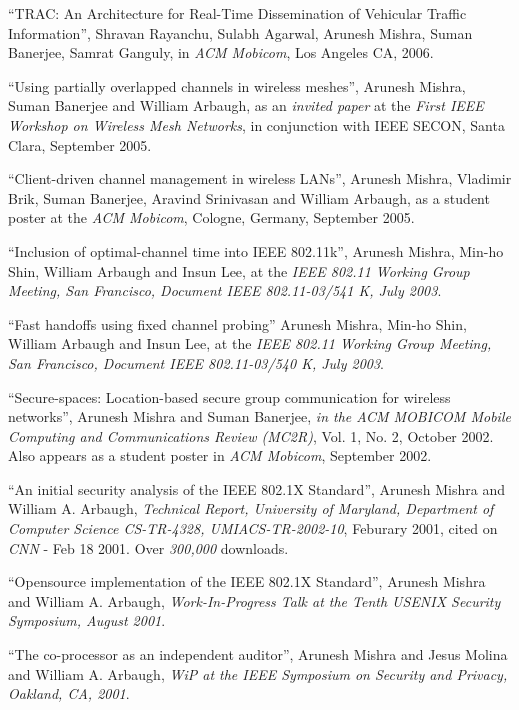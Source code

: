 \begin{resume}
\mybullet ``TRAC: An Architecture for Real-Time Dissemination of Vehicular Traffic Information'',
Shravan Rayanchu, Sulabh Agarwal, Arunesh Mishra, Suman Banerjee, Samrat Ganguly,  in {\it ACM Mobicom}, Los Angeles CA, 2006.

\mybullet ``Using partially overlapped channels in wireless meshes'', Arunesh Mishra, Suman Banerjee and William Arbaugh,
as an {\em invited paper} at the {\em First IEEE Workshop on Wireless Mesh Networks}, in conjunction with IEEE SECON,
Santa Clara, September 2005.

\mybullet ``Client-driven channel management in wireless LANs'', Arunesh Mishra, Vladimir Brik, Suman Banerjee, Aravind Srinivasan
and William Arbaugh, as a student poster at  the {\em ACM Mobicom}, Cologne, Germany, September 2005.

\mybullet ``Inclusion of optimal-channel time into IEEE 802.11k'', Arunesh Mishra,  Min-ho Shin, William Arbaugh and Insun Lee,
at the {\em IEEE 802.11 Working Group Meeting, San Francisco, Document IEEE 802.11-03/541 K, July 2003}.

\mybullet ``Fast handoffs using fixed channel probing'' Arunesh Mishra, Min-ho Shin, William Arbaugh and Insun Lee, at the 
{\em IEEE 802.11 Working Group Meeting, San Francisco, Document IEEE 802.11-03/540 K, July 2003}.

\mybullet ``Secure-spaces: Location-based secure group communication for wireless networks'', Arunesh Mishra and 
Suman Banerjee, {\em in the ACM MOBICOM Mobile Computing and Communications Review (MC2R)}, Vol. 1, No. 2, October 2002.
Also appears as a student poster in {\em ACM Mobicom}, September 2002.


\mybullet ``An initial security analysis of the IEEE 802.1X Standard'', Arunesh Mishra and William A. Arbaugh,
{\em Technical Report, University of Maryland, Department of Computer Science CS-TR-4328, 
UMIACS-TR-2002-10}, Feburary 2001, cited on {\em CNN} - Feb 18 2001. Over {\em 300,000} downloads.


\mybullet ``Opensource implementation of the IEEE 802.1X Standard'', Arunesh Mishra and William A. Arbaugh,
{\em Work-In-Progress Talk at the Tenth USENIX Security Symposium, August 2001}.


\mybullet ``The co-processor as an independent auditor'', Arunesh Mishra and Jesus Molina and William A. Arbaugh,
{\em WiP at the IEEE Symposium on Security and Privacy, Oakland, CA, 2001}.



\end{resume}
